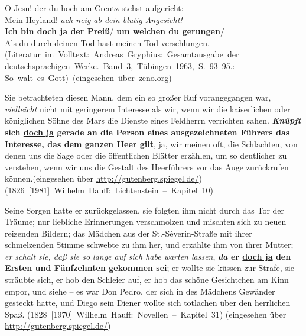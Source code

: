 \begin{exe}
	\ex\label{515} 

	O Jesu! der du hoch am Creutz stehst aufgericht:\\
	Mein Heyland! \emph{ach neig  ab dein blutig Angesicht!}\\
	\textbf{Ich bin \underline{doch ja} der Preiß}/ \textbf{um welchen du gerungen}/\\
	Als du durch deinen Tod hast meinen Tod verschlungen.
	\newline
	\hbox{}\hfill\hbox{(Literatur im Volltext: Andreas Gryphius: Gesamtausgabe der}
	\newline
	\hbox{}\hfill\hbox{deutschsprachigen Werke. Band 3, Tübingen 1963, S. 93--95.:}
	\newline
	\hbox{}\hfill\hbox{So walt es Gott) (eingesehen über zeno.org)}
\end{exe}\largerpage
	
\begin{exe}
	\ex\label{516} 
	Sie betrachteten diesen Mann, dem ein so großer Ruf vorangegangen war, \emph{vielleicht} nicht mit geringerem Interesse als wir, wenn wir die kaiserlichen oder königlichen Söhne des Mars die Dienste eines Feldherrn verrichten sahen. \textbf{\textit{Knüpft} sich \underline{doch ja} gerade an die Person eines ausgezeichneten Führers das Interesse, das dem ganzen Heer gilt}, ja, wir meinen oft, die Schlachten, von denen uns die Sage oder die öffentlichen Blätter erzählen, um so deutlicher zu verstehen, wenn wir uns die Gestalt des Heerführers vor das Auge zurückrufen können.\hfill{\scriptsize(eingesehen über \url{http://gutenberg.spiegel.de/})}
	\newline
	\hbox{}\hfill\hbox{(1826 [1981] Wilhelm Hauff: Lichtenstein – Kapitel 10)}
\end{exe}		
							  
\begin{exe}
	\ex\label{517} 

	Seine Sorgen hatte er zurückgelassen, sie folgten ihm nicht durch das Tor der Träume; nur liebliche Erinnerungen verschmolzen und mischten sich zu 			neuen reizenden Bildern; das Mädchen aus der St.-Séverin-Straße mit ihrer schmelzenden Stimme schwebte zu ihm her, und erzählte ihm von ihrer Mutter; 		\emph{er schalt sie, daß sie so lange auf sich habe warten lassen}, \textbf{\textit{da} er \underline{doch ja} den Ersten und Fünf\-zehnten gekommen sei}; er wollte sie küssen zur Strafe, sie sträubte sich, er hob den Schleier auf, er hob das schöne Gesichtchen am Kinn empor, und siehe – 		es war Don Pedro, der sich in des Mädchens Gewänder gesteckt hatte, und Diego sein Diener wollte sich totlachen über den herrlichen Spaß. 
	\newline
	\hbox{}\hfill\hbox{(1828 [1970] Wilhelm Hauff: Novellen – Kapitel 31)}
	\newline
	\hbox{}\hfill{\scriptsize(eingesehen über \url{http://gutenberg.spiegel.de/})}
\end{exe}	
						    	        
